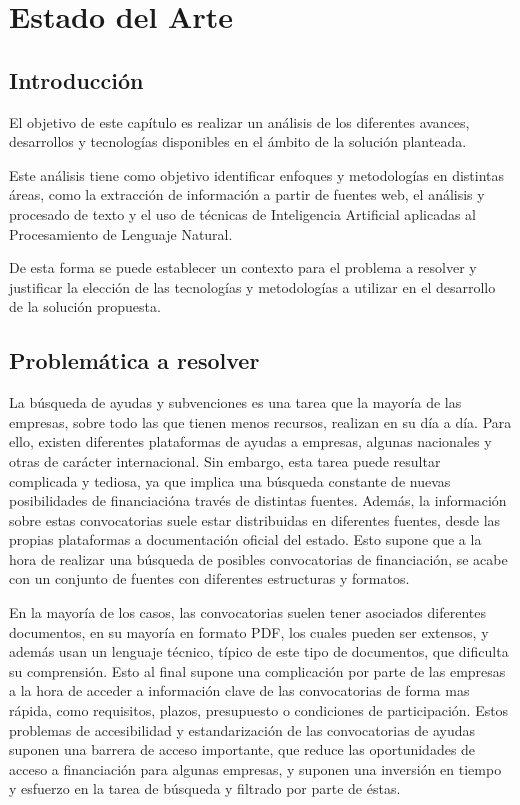 \chapter{Estado del Arte}
\label{chapter:Estado del Arte}


\section{Introducción}
El objetivo de este capítulo es realizar un análisis de los diferentes avances, desarrollos y tecnologías disponibles en el ámbito de la solución planteada. 

Este análisis tiene como objetivo identificar enfoques y metodologías en distintas áreas, como la extracción de información a partir de fuentes web, el análisis y procesado de texto y el uso de técnicas de Inteligencia Artificial aplicadas al Procesamiento de Lenguaje Natural.

De esta forma se puede establecer un contexto para el problema a resolver y justificar la elección de las tecnologías y metodologías a utilizar en el desarrollo de la solución propuesta.

\section{Problemática a resolver}

La búsqueda de ayudas y subvenciones es una tarea que la mayoría de las empresas, sobre todo las que tienen menos recursos, realizan en su día a día.
Para ello, existen diferentes plataformas de ayudas a empresas, algunas nacionales y otras de carácter internacional. 
Sin embargo, esta tarea puede resultar complicada y tediosa, ya que implica una búsqueda constante de nuevas posibilidades de financiacióna través de distintas fuentes.
Además, la información sobre estas convocatorias suele estar distribuidas en diferentes fuentes, desde las propias plataformas a documentación oficial del estado.
Esto supone que a la hora de realizar una búsqueda de posibles convocatorias de financiación, se acabe con un conjunto de fuentes con diferentes estructuras y formatos.

En la mayoría de los casos, las convocatorias suelen tener asociados diferentes documentos, en su mayoría en formato PDF, los cuales pueden ser extensos, y además usan un lenguaje técnico, típico de este tipo de documentos, que dificulta su comprensión.
Esto al final supone una complicación por parte de las empresas a la hora de acceder a información clave de las convocatorias de forma mas rápida, como requisitos, plazos, presupuesto o condiciones de participación.
Estos problemas de accesibilidad y estandarización de las convocatorias de ayudas suponen una barrera de acceso importante, que reduce las oportunidades de acceso a financiación para algunas empresas, y suponen una inversión en tiempo y esfuerzo en la tarea de búsqueda y filtrado por parte de éstas.

